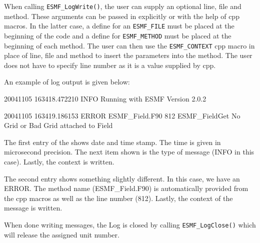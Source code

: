 When calling {\tt ESMF\_LogWrite()}, the user can supply an optional line,
file and method.  These arguments can be passed in explicitly or with the help
of cpp macros.  In the latter case, a define for an {\tt ESMF\_FILE} must be 
placed at the beginning of the code and a define for {\tt ESMF\_METHOD} must
be placed at the beginning of each method.  The user can then use the
{\tt ESMF\_CONTEXT} cpp macro in place of line, file and method to insert the 
parameters into the method.  The user does not have to specify line number as
it is a value supplied by cpp.

An example of log output is given below:

20041105 163418.472210 INFO      Running with ESMF Version 2.0.2   

20041105 163419.186153 ERROR     ESMF\_Field.F90             812  ESMF\_FieldGet
No Grid or Bad Grid attached to Field

The first entry of the shows date and time stamp.  The time is given in 
microsecond precision.  The next item shown is the type of message (INFO 
in this case).  Lastly, the context is written.

The second entry shows something slightly different.  In this case, we have
an ERROR.  The method name (ESMF\_Field.F90) is automatically provided from 
the cpp macros as well as the line number (812).  Lastly, the context of the 
message is written.
 
When done writing messages, the Log is closed by calling 
{\tt ESMF\_LogClose()} which will release the assigned unit number.




